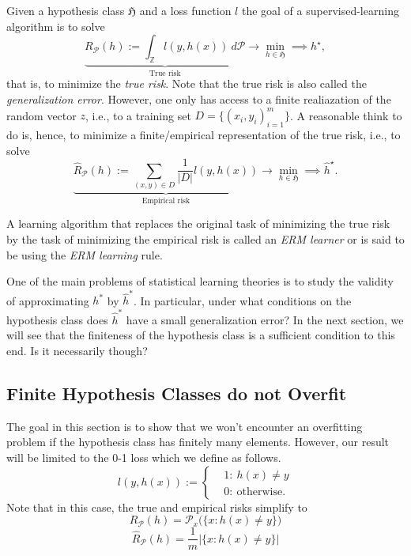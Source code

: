 Given a hypothesis class $\mathfrak{H}$  and a loss function $l$ the goal of a supervised-learning
algorithm is to solve 
\begin{equation*}
    \underbrace{R_{\mathcal{P}}(h) := \int_{\mathbb{Z}} l(y, h(x)) \ d \mathcal{P}}_{\text{True risk}} \longrightarrow \min_{h \in \mathfrak{H}} \implies h^\star, 
\end{equation*}
that is, to minimize the \emph{true risk}. Note that the true risk is also called the
\emph{generalization error}. However, one only has access to a finite
realiazation of the random vector $z$, i.e., to a training set $D=\{(x_i,
y_i)_{i=1}^m\}$. A reasonable think to do is, hence, to minimize a
finite/empirical representation of the true risk, i.e., to solve
\begin{equation*}
    \underbrace{\hat{R}_{\mathcal{P}} (h) := \sum_{(x,y) \in D} \frac{1}{|D|}l(y, h(x)) }_{\text{Empirical risk}} \longrightarrow \min_{h \in \mathfrak{H}} \implies \hat{h}^\star.
\end{equation*}

A learning algorithm that replaces the original task of minimizing the true risk
by the task of minimizing the empirical risk is called an \emph{ERM learner} or
is said to be using the \emph{ERM learning} rule. 

One of the main problems of statistical learning theories is to study the
validity of approximating $h^*$ by $\hat{h}^*$. In particular, under what
conditions on the hypothesis class does $\hat{h}^*$ have a small generalization error?
In the next section, we will see that the finiteness of the hypothesis class is
a sufficient condition to this end. Is it necessarily though?


\subsection{Finite Hypothesis Classes do not Overfit}
The goal in this section is to show that we won't encounter an overfitting
problem if the hypothesis class has finitely many elements. However, our result
will be limited to the  0-1 loss which we define as follows.
\begin{equation*}
    l(y, h(x)) :=
    \begin{cases}
         & 1: \ h(x) \neq y \\
        & 0: \ \text{otherwise}.
    \end{cases}	
\end{equation*}
Note that in this case, the true and empirical risks simplify to
$$
R_{\mathcal{P}}(h) = \mathcal{P}_x \bigl(\{x: h(x) \neq y\} \bigr)
$$
$$
\hat{R}_{\mathcal{P}}(h) = \frac{1}{m} | \{x: h(x) \neq y\} |
$$

